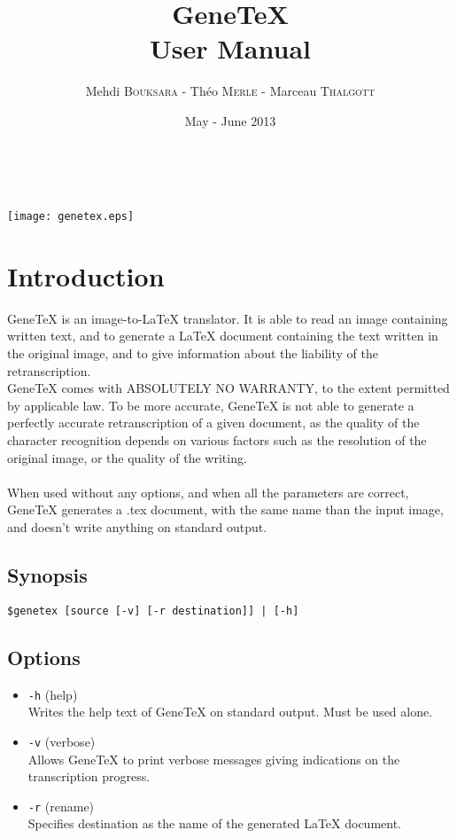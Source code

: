 \documentclass[12pt]{article}
\title{\textbf{GeneTeX \\
  User Manual}}
\author{Mehdi \textsc{Bouksara} - Théo \textsc{Merle} - Marceau \textsc{Thalgott} \\}
\date{May - June 2013}
\begin{document}
\maketitle
~\\
\begin{center}
\texttt{[image: genetex.eps]}
\end{center}

\newpage
\section{Introduction}

GeneTeX is an image-to-LaTeX translator. It is able to read an image containing written text, and to generate a LaTeX document containing the text written in the original image, and to give information about the liability of the retranscription.\\
GeneTeX comes with ABSOLUTELY NO WARRANTY, to the extent permitted by applicable law. To be more accurate, GeneTeX is not able to generate a perfectly accurate retranscription of a given document, as the quality of the character recognition depends on various factors such as the resolution of the original image, or the quality of the writing.\\
\\
When used without any options, and when all the parameters are correct, GeneTeX generates a .tex document, with the same name than the input image, and doesn't write anything on standard output.


\subsection{Synopsis}
\lstinline{$genetex [source [-v] [-r destination]] | [-h] }\\ %

\subsection{Options}
\begin{itemize}
       \item[] \lstinline!-h! (help)\\
         Writes the help text of GeneTeX on standard output. Must be used alone.
       \item[] \lstinline!-v! (verbose)\\
         Allows GeneTeX to print verbose messages giving indications on the transcription progress.
       \item[]\lstinline!-r! (rename)\\
         Specifies destination as the name of the generated LaTeX document.
\end{itemize}
\end{document}
